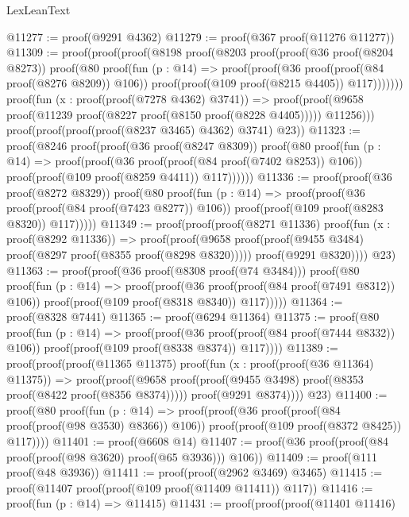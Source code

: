 \begin{lexlean}{LexLeanText}
\begin{coremodule}
@11277 := proof(@9291 @4362)
@11279 := proof(@367 proof(@11276 @11277))
@11309 := proof(proof(proof(@8198
          proof(@8203
              proof(proof(@36 proof(@8204 @8273))
                  proof(@80
                      proof(fun (p : @14) =>
                        proof(proof(@36 proof(proof(@84 proof(@8276 @8209)) @106))
                            proof(proof(@109 proof(@8215 @4405)) @117)))))))
        proof(fun (x : proof(proof(@7278 @4362) @3741)) =>
          proof(proof(@9658 proof(@11239 proof(@8227 proof(@8150 proof(@8228 @4405))))) @11256)))
      proof(proof(proof(proof(@8237 @3465) @4362) @3741) @23))
@11323 := proof(@8246
      proof(proof(@36 proof(@8247 @8309))
          proof(@80
              proof(fun (p : @14) =>
                proof(proof(@36 proof(proof(@84 proof(@7402 @8253)) @106))
                    proof(proof(@109 proof(@8259 @4411)) @117))))))
@11336 := proof(proof(@36 proof(@8272 @8329))
      proof(@80
          proof(fun (p : @14) =>
            proof(proof(@36 proof(proof(@84 proof(@7423 @8277)) @106))
                proof(proof(@109 proof(@8283 @8320)) @117)))))
@11349 := proof(proof(proof(@8271 @11336)
        proof(fun (x : proof(@8292 @11336)) =>
          proof(proof(@9658 proof(proof(@9455 @3484) proof(@8297 proof(@8355 proof(@8298 @8320)))))
              proof(@9291 @8320))))
      @23)
@11363 := proof(proof(@36 proof(@8308 proof(@74 @3484)))
      proof(@80
          proof(fun (p : @14) =>
            proof(proof(@36 proof(proof(@84 proof(@7491 @8312)) @106))
                proof(proof(@109 proof(@8318 @8340)) @117)))))
@11364 := proof(@8328 @7441)
@11365 := proof(@6294 @11364)
@11375 := proof(@80
      proof(fun (p : @14) =>
        proof(proof(@36 proof(proof(@84 proof(@7444 @8332)) @106))
            proof(proof(@109 proof(@8338 @8374)) @117))))
@11389 := proof(proof(proof(@11365 @11375)
        proof(fun (x : proof(proof(@36 @11364) @11375)) =>
          proof(proof(@9658 proof(proof(@9455 @3498) proof(@8353 proof(@8422 proof(@8356 @8374)))))
              proof(@9291 @8374))))
      @23)
@11400 := proof(@80
      proof(fun (p : @14) =>
        proof(proof(@36 proof(proof(@84 proof(proof(@98 @3530) @8366)) @106))
            proof(proof(@109 proof(@8372 @8425)) @117))))
@11401 := proof(@6608 @14)
@11407 := proof(@36 proof(proof(@84 proof(proof(@98 @3620) proof(@65 @3936))) @106))
@11409 := proof(@111 proof(@48 @3936))
@11411 := proof(proof(@2962 @3469) @3465)
@11415 := proof(@11407 proof(proof(@109 proof(@11409 @11411)) @117))
@11416 := proof(fun (p : @14) => @11415)
@11431 := proof(proof(proof(@11401 @11416)

\end{coremodule}
\end{lexlean}
